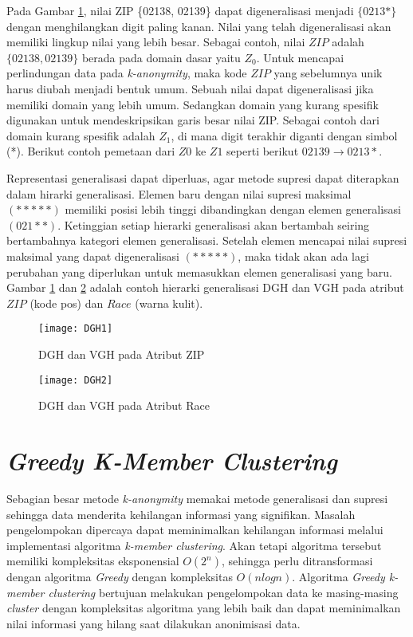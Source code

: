Pada Gambar \ref{fig:DGH1}, nilai ZIP \{02138, 02139\} dapat digeneralisasi menjadi $\{0213*\}$ dengan menghilangkan digit paling kanan. Nilai yang telah digeneralisasi akan memiliki lingkup nilai yang lebih besar. Sebagai contoh, nilai $ZIP$ adalah $\{02138, 02139\}$ berada pada domain dasar yaitu $Z_0$. Untuk mencapai perlindungan data pada \textit{k-anonymity}, maka kode $ZIP$ yang sebelumnya unik harus diubah menjadi bentuk umum. Sebuah nilai dapat digeneralisasi jika memiliki domain yang lebih umum. Sedangkan domain yang kurang spesifik digunakan untuk mendeskripsikan garis besar nilai ZIP. Sebagai contoh dari domain kurang spesifik adalah $Z_1$, di mana digit terakhir diganti dengan simbol (*). Berikut contoh pemetaan dari $Z0$ ke $Z1$ seperti berikut $02139 \rightarrow 0213*$.

Representasi generalisasi dapat diperluas, agar metode supresi dapat diterapkan dalam hirarki generalisasi. Elemen baru dengan nilai supresi maksimal $(*****)$ memiliki posisi lebih tinggi dibandingkan dengan elemen generalisasi $(021**)$. Ketinggian setiap hierarki generalisasi akan bertambah seiring bertambahnya kategori elemen generalisasi. Setelah elemen mencapai nilai supresi maksimal yang dapat digeneralisasi $(*****)$, maka tidak akan ada lagi perubahan yang diperlukan untuk memasukkan elemen generalisasi yang baru. Gambar \ref{fig:DGH1} dan \ref{fig:DGH2} adalah contoh hierarki generalisasi DGH dan VGH pada atribut $ZIP$ (kode pos) dan $Race$ (warna kulit).

\begin{figure}[H]
	\centering
	\texttt{[image: DGH1]}
	\caption{DGH dan VGH pada Atribut ZIP}
	\label{fig:DGH1}
\end{figure}

\begin{figure}[H]
	\centering
	\texttt{[image: DGH2]}
	\caption{DGH dan VGH pada Atribut Race}
	\label{fig:DGH2}
\end{figure}


\section{\textit{Greedy K-Member Clustering}}
\label{sec:greedyclustering}
Sebagian besar metode \textit{k-anonymity} memakai metode generalisasi dan supresi sehingga data menderita kehilangan informasi yang signifikan. Masalah pengelompokan dipercaya dapat meminimalkan kehilangan informasi melalui implementasi algoritma \textit{k-member clustering}. Akan tetapi algoritma tersebut memiliki kompleksitas eksponensial $O(2^n)$, sehingga perlu ditransformasi dengan algoritma \textit{Greedy} dengan kompleksitas $O(n log n)$. Algoritma \textit{Greedy k-member clustering} bertujuan melakukan pengelompokan data ke masing-masing \textit{cluster} dengan kompleksitas algoritma yang lebih baik dan dapat meminimalkan nilai informasi yang hilang saat dilakukan anonimisasi data.


